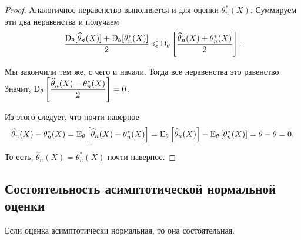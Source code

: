 \begin{proof}
    Аналогичное неравенство выполняется и для оценки $\theta_n^*(X)$. Суммируем эти два неравенства и получаем
    \begin{equation*}
        \dfrac{\operatorname{D}_{\theta}[\widehat{\theta}_n(X)] + \operatorname{D}_{\theta}[\theta_n^*(X)]}{2}
        \leqslant \operatorname{D}_{\theta}\left[ \dfrac{\widehat{\theta}_n(X) + \theta_n^*(X)}{2} \right].
    \end{equation*}

    Мы закончили тем же, с чего и начали. Тогда все неравенства это равенство. Значит, $\operatorname{D}_{\theta}\left[ \dfrac{\widehat{\theta}_n(X) - \theta_n^*(X)}{2} \right] = 0$. 

    Из этого следует, что почти наверное
    \begin{equation*}
        \widehat{\theta}_n(X) - \theta_n^*(X)
        = \operatorname{E}_{\theta}\left[ \widehat{\theta}_n(X) - \theta_n^*(X) \right] 
        =
        \operatorname{E}_{\theta}\left[ \widehat{\theta}_n(X) \right] - \operatorname{E}_{\theta}\left[ \theta_n^*(X) \right] 
        = \theta - \theta
        = 0.
    \end{equation*}

    То есть, $\widehat{\theta}_n(X) = \theta_n^*(X)$ почти наверное.
\end{proof}

\subsection{Состоятельность асимптотической нормальной оценки}

\begin{proposition*}
    Если оценка асимптотически нормальная, то она состоятельная.
\end{proposition*}

